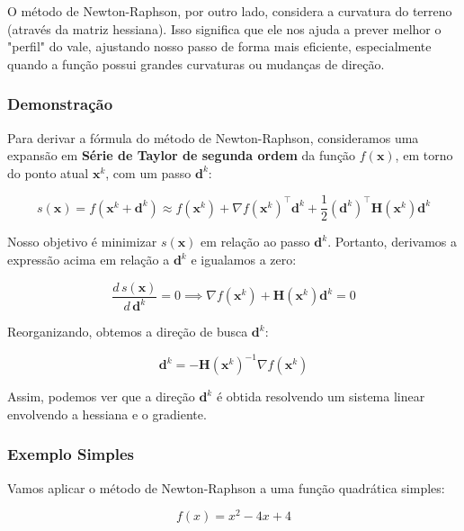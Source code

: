 \documentclass[a4paper, 12pt]{article}
\begin{document}
O método de Newton-Raphson, por outro lado, considera a curvatura do terreno (através da matriz hessiana). Isso significa que ele nos ajuda a prever melhor o "perfil" do vale, ajustando nosso passo de forma mais eficiente, especialmente quando a função possui grandes curvaturas ou mudanças de direção.

\subsubsection{Demonstração}

Para derivar a fórmula do método de Newton-Raphson, consideramos uma expansão em \textbf{Série de Taylor de segunda ordem} da função $f(\mathbf{x})$, em torno do ponto atual $\mathbf{x}^k$, com um passo $\mathbf{d}^k$:

\begin{equation}
    s(\mathbf{x}) = f(\mathbf{x}^k + \mathbf{d}^k) \approx f(\mathbf{x}^k) + \nabla f(\mathbf{x}^k)^\top \mathbf{d}^k + \frac{1}{2} (\mathbf{d}^k)^\top \mathbf{H}(\mathbf{x}^k) \mathbf{d}^k
\end{equation}

Nosso objetivo é minimizar $s(\mathbf{x})$ em relação ao passo $\mathbf{d}^k$. Portanto, derivamos a expressão acima em relação a $\mathbf{d}^k$ e igualamos a zero:

\begin{equation}
    \frac{d \, s(\mathbf{x})}{d \, \mathbf{d}^k} = 0 \implies \nabla f(\mathbf{x}^k) + \mathbf{H}(\mathbf{x}^k) \mathbf{d}^k = 0
\end{equation}

Reorganizando, obtemos a direção de busca $\mathbf{d}^k$:

\begin{equation}
    \mathbf{d}^k = -\mathbf{H}(\mathbf{x}^k)^{-1} \nabla f(\mathbf{x}^k)
\end{equation}

Assim, podemos ver que a direção $\mathbf{d}^k$ é obtida resolvendo um sistema linear envolvendo a hessiana e o gradiente.

\subsubsection{Exemplo Simples}

Vamos aplicar o método de Newton-Raphson a uma função quadrática simples:

\begin{equation}
    f(x) = x^2 - 4x + 4
\end{equation}
\end{document}

